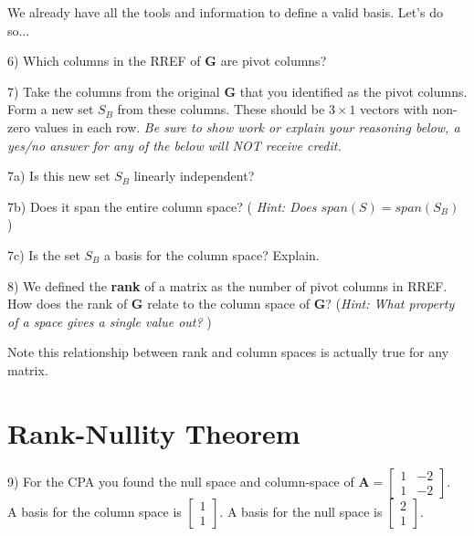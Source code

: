 \documentclass{article}
\begin{document}
\begin{flushleft}
\vspace{1.5in}

We already have all the tools and information to define a valid basis. Let's do so...

\vspace{0.1in}

6) Which columns in the RREF of \textbf{G} are pivot columns?

\vspace{0.75in}

7) Take the columns from the original \textbf{G} that you identified as the pivot columns. Form a new set $S_{B}$ from these columns. These should be $3 \times 1$ vectors with non-zero values in each row.  \textit{Be sure to show work or explain your reasoning below, a yes/no answer for any of the below will NOT receive credit.}

\vspace{0.1in}

7a) Is this new set $S_{B}$ linearly independent?

\vspace{1.5in}

7b) Does it span the entire column space? ( \textit{Hint: Does $span( S ) = span ( S_{B} ) $ } )

\vspace{1.5in}

7c) Is the set $S_{B}$ a basis for the column space? Explain.

\vspace{0.75in}

8) We defined the \textbf{rank} of a matrix as the number of pivot columns in RREF. How does the rank of \textbf{G} relate to the column space of \textbf{G}? (\textit{Hint: What property of a space gives a single value out?} )

\vspace{1.6in}

\Large Note this relationship between rank and column spaces is actually true for any matrix. \normalsize

\newpage 

\section*{Rank-Nullity Theorem}
9) For the CPA you found the null space and column-space of $\textbf{A}=\begin{bmatrix} 1 & -2 \\ 1 & -2 \end{bmatrix}$.\\
A basis for the column space is $\begin{bmatrix} 1 \\ 1 \end{bmatrix}$. A basis for the null space is $\begin{bmatrix} 2 \\ 1 \end{bmatrix}$.


\end{flushleft}
\end{document}
